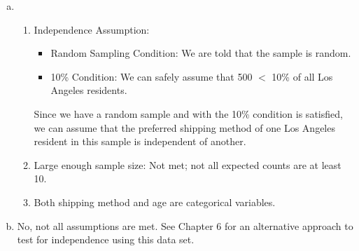 {{\begin{enumerate}[(a)]
\item \begin{enumerate}[1.]
\item Independence Assumption: 
\begin{itemize}
\item Random Sampling Condition: We are told that the sample is random.
\item 10\% Condition: We can safely assume that 500 $<$ 10\% of all Los Angeles residents.
\end{itemize}
Since we have a random sample and with the 10\% condition is satisfied, we can assume that the preferred shipping method of one Los Angeles resident in this sample is independent of another.
\item Large enough sample size: Not met; not all expected counts are at least 10.
\item Both shipping method and age are categorical variables.
\end{enumerate}
\item No, not all assumptions are met. See Chapter 6 for an alternative approach to test for independence using this data set.
\end{enumerate}
}
}



%
%	
















